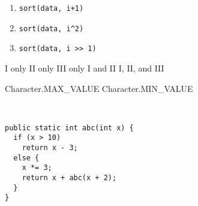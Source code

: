 \documentclass[11pt,addpoints]{exam}
\begin{document}
\begin{questions}
\begin{minipage}{\textwidth}
\begin{enumerate}[label=\Roman*.]
  \item {\tt sort(data, i+1)}
  \item {\tt sort(data, i\textasciicircum2)}
  \item {\tt sort(data, i >> 1)} \\
\end{enumerate}

\begin{choices}
  \choice I only
  \choice II only
  \choice III only
  \choice I and II
  \choice I, II, and III \\
\end{choices}

\end{minipage}


\begin{minipage}{\textwidth}

\begin{choices}
  \choice Character.MAX\_VALUE
  \choice Character.MIN\_VALUE
   \\ 
\end{choices}
\end{minipage}

\begin{minipage}{\textwidth}

\begin{choices}
   \\
\end{choices}
\end{minipage}

\begin{minipage}{\textwidth}



\begin{verbatim}
public static int abc(int x) {
  if (x > 10)
    return x - 3;
  else {
    x *= 3;
    return x + abc(x + 2);
  }
}
\end{verbatim}


\end{minipage}
\end{questions}
\end{document}
